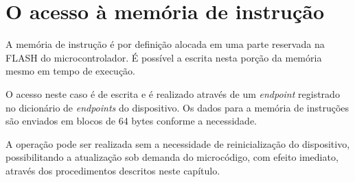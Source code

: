 \section{O acesso à memória de instrução}

A memória de instrução é por definição alocada em uma parte reservada na FLASH do microcontrolador.
É possível a escrita nesta porção da memória mesmo em tempo de execução.

O acesso neste caso é de escrita e é realizado através de um \textit{endpoint} registrado no dicionário de \textit{endpoints} do dispositivo. Os dados para a memória de instruções são enviados em blocos de 64 bytes conforme a necessidade.

A operação pode ser realizada sem a necessidade de reinicialização do dispositivo, possibilitando a atualização sob demanda do microcódigo, com efeito imediato, através dos procedimentos descritos neste capítulo.
